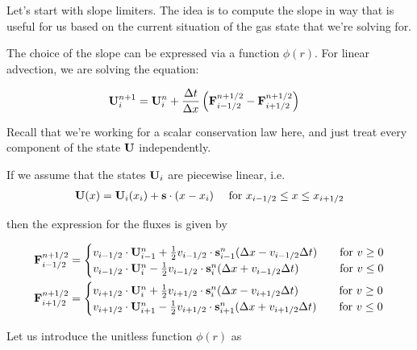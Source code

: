 Let's start with slope limiters.
The idea is to compute the slope in way that is useful for us based on the current situation of the gas state that we're solving for.

The choice of the slope can be expressed via a function $\phi(r)$.
For linear advection, we are solving the equation:

\begin{align}
	\mathbf{U}_i ^{n+1} &= 
		\mathbf{U}_i^{n} +  \frac{\Delta t}{\Delta x} \left( \mathbf{F}_{i-1/2}^{n+1/2} - \mathbf{F}_{i+1/2}^{n+1/2} \right) \label{eq:advection}
\end{align}


Recall that we're working for a scalar conservation law here, and just treat every component of the state $\mathbf{U}$ independently.


If we assume that the states $\mathbf{U}_i$ are piecewise linear, i.e.
\begin{align}
	\mathbf{U}(x) = \mathbf{U}_i(x_i) + \mathbf{s}\cdot (x - x_i) \quad \text{ for } x_{i-1/2} \leq x \leq x_{i+1/2} \label{eq:advection-slope}
\end{align}


then the expression for the fluxes is given by


\begin{align*}
	\mathbf{F}_{i-1/2}^{n+1/2} &= 
		\begin{cases}
			v_{i-1/2} \cdot \mathbf{U}_{i-1}^n +  \frac{1}{2} v_{i-1/2} \cdot\mathbf{s}_{i-1}^n (\Delta x -  v_{i-1/2} \Delta t)
			 	& \quad \text{for } v \geq 0 \\
			v_{i-1/2} \cdot \mathbf{U}_{i}^n -\frac{1}{2} v_{i-1/2} \cdot \mathbf{s}_{i}^n (\Delta x + v_{i-1/2} \Delta t)
				& \quad \text{for } v \leq 0 \\
		\end{cases} \\
	\mathbf{F}_{i+1/2}^{n+1/2} &= 
		\begin{cases}
			v_{i+1/2} \cdot \mathbf{U}_{i}^n +  \frac{1}{2} v_{i+1/2} \cdot\mathbf{s}_{i}^n (\Delta x -  v_{i+1/2} \Delta t)
			 	& \quad \text{for } v \geq 0 \\
			v_{i+1/2} \cdot \mathbf{U}_{i+1}^n -\frac{1}{2} v_{i+1/2} \cdot \mathbf{s}_{i+1}^n (\Delta x + v_{i+1/2} \Delta t)
				& \quad \text{for } v \leq 0 \\
		\end{cases} \\		
\end{align*}




Let us introduce the unitless function $\phi(r)$ as


